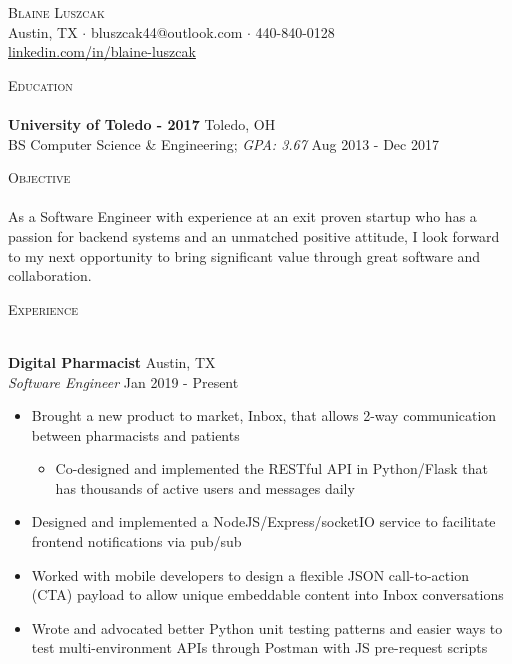 \documentclass[a4paper]{article}
\newcommand{\lineunder} {
    \vspace*{-8pt} \\
    \hspace*{-18pt} \hrulefill \\
}
\newcommand{\header} [1] {
    {\hspace*{-18pt}\vspace*{6pt} \textsc{#1}}
    \vspace*{-6pt} \lineunder
}
\begin{document}
\vspace*{-40pt}

\vspace*{-10pt}
\begin{center}
    {\Huge \scshape {Blaine Luszcak}}\\
    Austin, TX $\cdot$ bluszcak44@outlook.com $\cdot$ 440-840-0128 \\
    \url{linkedin.com/in/blaine-luszcak}
\end{center}

\header{Education}
\textbf{University of Toledo - 2017} \hfill Toledo, OH \\
BS Computer Science \& Engineering; \textit{GPA: 3.67} \hfill Aug 2013 - Dec 2017 \\
\vspace{2mm}

\header{Objective}
As a Software Engineer with experience at an exit proven startup who has a passion for backend systems and an
unmatched positive attitude, I look forward to my next opportunity to bring significant value through great software and
collaboration.

\vspace{2mm}

\header{Experience}
\vspace{1mm}

\textbf{Digital Pharmacist} \hfill Austin, TX \\
\textit{Software Engineer} \hfill Jan 2019 - Present \\
\vspace{-3mm}
\begin{itemize} \itemsep -0.25mm
    \item Brought a new product to market, Inbox, that allows 2-way communication between pharmacists and patients
        \begin{itemize} \itemsep -1mm
            \item Co-designed and implemented the RESTful API in Python/Flask that has thousands of active users
            and messages daily
        \end{itemize}
    \item Designed and implemented a NodeJS/Express/socketIO service to facilitate frontend notifications via pub/sub
    \item Worked with mobile developers to design a flexible JSON call-to-action (CTA) payload to allow unique 
    embeddable content into Inbox conversations
    \item Wrote and advocated better Python unit testing patterns and easier ways to test multi-environment APIs through
    Postman with JS pre-request scripts
\end{itemize}
\vspace{-2mm}
\end{document}
